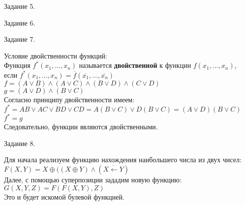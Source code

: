 \documentclass[a4paper,12pt]{report} %
\begin{document}
\bigskip

\begin{center}
Задание 5.\\
\end{center}

\begin{flushleft}

\end{flushleft}

\bigskip

\begin{center}
Задание 6.\\
\end{center}

\begin{flushleft}

\end{flushleft}

\bigskip

\begin{center}
Задание 7.\\
\end{center}

\begin{flushleft}
Условие двойственности функций:\\
Функция $f^{*}(x_1, \ldots , x_n)$ называется \textbf{двойственной} к функции $f(x_1, \ldots , x_n)$,\\
если $f^{*}(x_1, \ldots , x_n) = \overline{f}(\overline{x_1}, \ldots , \overline{x_n})$\\
\bigskip
$f=(A \vee B) \wedge (A \vee C) \wedge (B \vee D) \wedge (C \vee D)$\\
$g= (A \vee D) \wedge (B \vee C)$\\
Согласно принципу двойственности имеем:\\
$f^{*}= AB \vee AC \vee BD \vee CD = A(B \vee C) \vee D(B \vee C) = (A\vee D)(B \vee C)$\\
$f^{*} = g$\\
Следовательно, функции являются двойственными.
\end{flushleft}

\bigskip

\begin{center}
Задание 8.\\
\end{center}

\begin{flushleft}
Для начала реализуем функцию нахождения наибольшего числа из двух чисел:\\
$F(X,Y)=X \oplus ((X \oplus Y) \wedge (\overline{X \leftarrow Y}) $\\
Далее, с помощью суперпозиции зададим новую функцию:\\
$G(X,Y,Z) = F(F(X,Y),Z)$\\
Это и будет искомой булевой функцией.

\end{flushleft}
\end{document}
